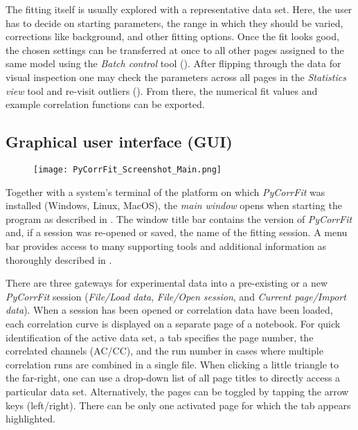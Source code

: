 The fitting itself is usually explored with a representative data set. Here, the user has to decide on starting parameters, the range in which they should be varied, corrections like background, and other fitting options. Once the fit looks good, the chosen settings can be transferred at once to all other pages assigned to the same model using the \textit{Batch control} tool (). After flipping through the data for visual inspection one may check the parameters across all pages in the \textit{Statistics view} tool and re-visit outliers (). From there, the numerical fit values and example correlation functions can be exported.

\subsection{Graphical user interface (GUI)}
\label{sec:intro.graph}
\begin{figure}[h]
\centering
\texttt{[image: PyCorrFit\_Screenshot\_Main.png]}
\end{figure}
Together with a system's terminal of the platform on which \textit{PyCorrFit} was installed (Windows, Linux, MacOS), the \textit{main window} opens when starting the program as described in . The window title bar contains the version of \textit{PyCorrFit} and, if a session was re-opened or saved, the name of the fitting session. A menu bar provides access to many supporting tools and additional information as thoroughly described in . 

There are three gateways for experimental data into a pre-existing or a new \textit{PyCorrFit} session (\textit{File/Load data}, \textit{File/Open session}, and \textit{Current page/Import data}). When a session has been opened or correlation data have been loaded, each correlation curve is displayed on a separate page of a notebook. For quick identification of the active data set, a tab specifies the page number, the correlated channels (AC/CC), and the run number in cases where  multiple correlation runs are combined in a single file. When clicking a little triangle to the far-right, one can use a drop-down list of all page titles to directly access a particular data set. Alternatively, the pages can be toggled by tapping the arrow keys (left/right). There can be only one activated page for which the tab appears highlighted.

